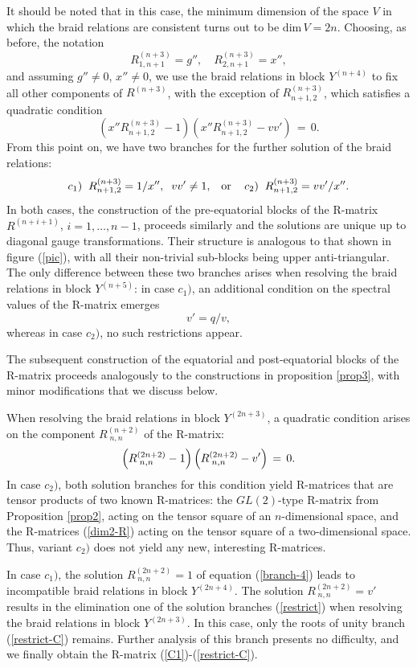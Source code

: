 \documentclass[11pt]{article}
\def\be{\begin{equation}}\def\ee{\end{equation}}
\begin{document}
It should be noted that in this case, the minimum dimension of the space $V$ in which the braid relations are consistent turns out to be
$\mbox{dim}\, V = 2n$.
Choosing, as before, the notation
$$
R^{(n+3)}_{1,n+1}=g'', \quad R^{(n+3)}_{2,n+1}=x'',
$$
and assuming $g''\neq 0$, $x''\neq 0$, we use the braid relations in block $Y^{(n+4)}$ to fix all other components of $R^{(n+3)}$, with the exception of $R^{(n+3)}_{n+1,2}$, which satisfies a quadratic condition
$$
\left(x''R^{(n+3)}_{n+1,2}-1\right)\left(x''R^{(n+3)}_{n+1,2}-v v'\right)\, =\, 0.
$$
From this point on, we have two branches for the further solution of the braid relations:
\be
\lb{branch-22} 
\mbox{$c_1)$}\;\;
R^{(n+3)}_{n+1,2}=1/x'', \;\; v v'\neq 1,\;\;\; \mbox{or\;\;\; $c_2)$}\;\; 
R^{(n+3)}_{n+1,2}=v v'/x''.
\ee
In both cases, the construction of the pre-equatorial blocks of the R-matrix
$R^{(n+i+1)}$, $i=1,\dots ,n-1$,
proceeds similarly and the solutions are unique up to diagonal gauge transformations.
Their structure is analogous to that shown in figure (\ref{pic}), with all their non-trivial sub-blocks being 
upper anti-triangular.
The only difference between these two branches arises
when resolving the braid relations in block $Y^{(n+5)}$: in case $c_1)$, an additional condition on the spectral values of the R-matrix emerges  
$$
v'=q/v,
$$
whereas in case $c_2)$, no such restrictions appear.\smallskip

The subsequent construction of the equatorial and post-equatorial blocks of the R-matrix proceeds analogously to the constructions in proposition \ref{prop3}, with minor modifications that we discuss below.

When resolving the braid relations in block $Y^{(2n+3)}$, a quadratic condition arises on the component $R^{(n+2)}_{\; n,n}$ of the R-matrix:
\be
\lb{branch-4}
\left(R^{(2n+2)}_{\;n,n}-1\right)\left(R^{(2n+2)}_{\;n,n}- v'\right)\, =\, 0.
\ee
In case $c_2)$, both solution branches for this condition yield R-matrices that are tensor products of two known R-matrices: the $GL(2)$-type R-matrix from Proposition \ref{prop2}, acting on the tensor square of an $n$-dimensional space, and the R-matrices     
(\ref{dim2-R})  acting on the tensor square of a two-dimensional space. Thus, variant $c_2)$ does not yield any new, interesting R-matrices.

In case $c_1)$, the solution $R^{(2n+2)}_{\;n,n}=1$ of equation (\ref{branch-4}) leads to incompatible braid relations in block
$Y^{(2n+4)}$. The solution $R^{(2n+2)}_{\;n,n}=v'$ results in the elimination one of the solution branches (\ref{restrict}) when resolving the braid relations in block $Y^{(2n+3)}$. In this case, only the roots of unity branch (\ref{restrict-C}) remains.
Further analysis of this branch presents no difficulty, and we finally obtain the R-matrix (\ref{C1})-(\ref{restrict-C}).
\smallskip
\end{document}
